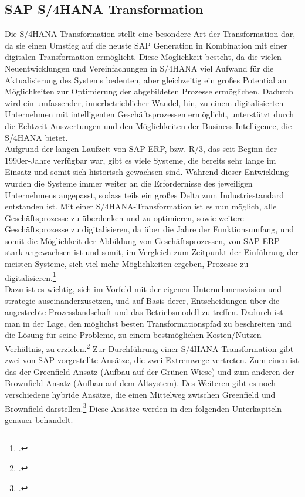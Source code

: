 \subsection{SAP S/4HANA Transformation}
\label{kap:s4hanatrans}
Die S/4HANA Transformation stellt eine besondere Art der Transformation dar, da sie einen Umstieg auf die neuste SAP Generation in Kombination mit einer digitalen Transformation ermöglicht. Diese Möglichkeit besteht, da die vielen Neuentwicklungen und Vereinfachungen in S/4HANA viel Aufwand für die Aktualisierung des Systems bedeuten, aber gleichzeitig ein großes Potential an Möglichkeiten zur Optimierung der abgebildeten Prozesse ermöglichen. Dadurch wird ein umfassender, innerbetrieblicher Wandel, hin, zu einem digitalisierten Unternehmen mit intelligenten Geschäftsprozessen ermöglicht, unterstützt durch die Echtzeit-Auswertungen und den Möglichkeiten der Business Intelligence, die S/4HANA bietet.
\\Aufgrund der langen Laufzeit von SAP-ERP, bzw. R/3, das seit Beginn der 1990er-Jahre verfügbar war, gibt es viele Systeme, die bereits sehr lange im Einsatz und somit sich historisch gewachsen sind. Während dieser Entwicklung wurden die Systeme immer weiter an die Erfordernisse des jeweiligen Unternehmens angepasst, sodass teils ein großes Delta zum Industriestandard entstanden ist. Mit einer S/4HANA-Transformation ist es nun möglich, alle Geschäftsprozesse zu überdenken und zu optimieren, sowie weitere Geschäftsprozesse zu digitalisieren, da über die Jahre der Funktionsumfang, und somit die Möglichkeit der Abbildung von Geschäftsprozessen, von SAP-ERP stark angewachsen ist und somit, im Vergleich zum Zeitpunkt der Einführung der meisten Systeme, sich viel mehr Möglichkeiten ergeben, Prozesse zu digitalisieren.\footcite[Vgl.][]{s4-interview}
\\Dazu ist es wichtig, sich im Vorfeld mit der eigenen Unternehmensvision und -strategie auseinanderzusetzen, und auf Basis derer, Entscheidungen über die angestrebte Prozesslandschaft und das Betriebsmodell zu treffen. Dadurch ist man in der Lage, den möglichst besten Transformationspfad zu beschreiten und die Lösung für seine Probleme, zu einem bestmöglichen Kosten/Nutzen-Verhältnis, zu erzielen.\footcite[Vgl.][]{ao-blog}
Zur Durchführung einer S/4HANA-Transformation gibt zwei von SAP vorgestellte Ansätze, die zwei Extremwege vertreten. Zum einen ist das der Greenfield-Ansatz (Aufbau auf der \glqq{}Grünen Wiese\grqq{}) und zum anderen der Brownfield-Ansatz (Aufbau auf dem Altsystem). Des Weiteren gibt es noch verschiedene hybride Ansätze, die einen Mittelweg zwischen Greenfield und Brownfield darstellen.\footcite[Vgl.][]{ao-blog} Diese Ansätze werden in den folgenden Unterkapiteln genauer behandelt.

